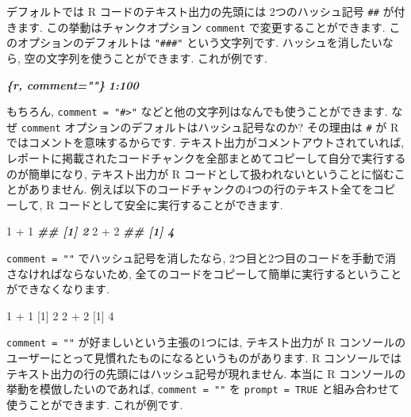 \documentclass[
  11pt,
]{bxjsreport}
\newenvironment{Shaded}{\begin{snugshade}}{\end{snugshade}}
\newcommand{\DecValTok}[1]{\textcolor[rgb]{0.00,0.00,0.81}{#1}}
\newcommand{\DocumentationTok}[1]{\textcolor[rgb]{0.56,0.35,0.01}{\textbf{\textit{#1}}}}
\newcommand{\InformationTok}[1]{\textcolor[rgb]{0.56,0.35,0.01}{\textbf{\textit{#1}}}}
\newcommand{\NormalTok}[1]{#1}
\newcommand{\SpecialCharTok}[1]{\textcolor[rgb]{0.00,0.00,0.00}{#1}}
\begin{document}
デフォルトでは R コードのテキスト出力の先頭には 2つのハッシュ記号 \texttt{\#\#} が付きます. この挙動はチャンクオプション \texttt{comment} で変更することができます. このオプションのデフォルトは \texttt{"\#\#\#"} という文字列です. ハッシュを消したいなら, 空の文字列を使うことができます. これが例です.

\begin{Shaded}
\begin{Highlighting}[]
\InformationTok{\textasciigrave{}\textasciigrave{}\textasciigrave{}\{r, comment=""\}}
\InformationTok{1:100}
\InformationTok{\textasciigrave{}\textasciigrave{}\textasciigrave{}}
\end{Highlighting}
\end{Shaded}

もちろん, \texttt{comment = "\#\textgreater{}"} などと他の文字列はなんでも使うことができます. なぜ \texttt{comment} オプションのデフォルトはハッシュ記号なのか? その理由は \texttt{\#} が R ではコメントを意味するからです. テキスト出力がコメントアウトされていれば, レポートに掲載されたコードチャンクを全部まとめてコピーして自分で実行するのが簡単になり, テキスト出力が R コードとして扱われないということに悩むことがありません. 例えば以下のコードチャンクの4つの行のテキスト全てをコピーして, R コードとして安全に実行することができます.

\begin{Shaded}
\begin{Highlighting}[numbers=left,,]
\DecValTok{1} \SpecialCharTok{+} \DecValTok{1}
\DocumentationTok{\#\# [1] 2}
\DecValTok{2} \SpecialCharTok{+} \DecValTok{2}
\DocumentationTok{\#\# [1] 4}
\end{Highlighting}
\end{Shaded}

\texttt{comment = ""} でハッシュ記号を消したなら, 2つ目と2つ目のコードを手動で消さなければならないため, 全てのコードをコピーして簡単に実行するということができなくなります.

\begin{Shaded}
\begin{Highlighting}[numbers=left,,]
\DecValTok{1} \SpecialCharTok{+} \DecValTok{1}
\NormalTok{[}\DecValTok{1}\NormalTok{] }\DecValTok{2}
\DecValTok{2} \SpecialCharTok{+} \DecValTok{2}
\NormalTok{[}\DecValTok{1}\NormalTok{] }\DecValTok{4}
\end{Highlighting}
\end{Shaded}

\texttt{comment = ""} が好ましいという主張の1つには, テキスト出力が R コンソールのユーザーにとって見慣れたものになるというものがあります. R コンソールではテキスト出力の行の先頭にはハッシュ記号が現れません. 本当に R コンソールの挙動を模倣したいのであれば, \texttt{comment = ""} を \texttt{prompt = TRUE} と組み合わせて使うことができます. これが例です.
\end{document}
